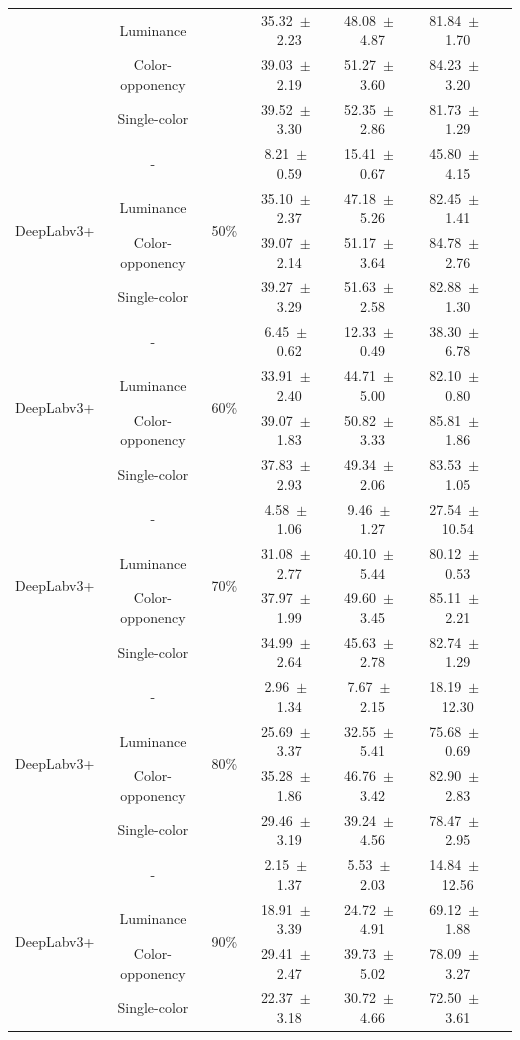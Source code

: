 \begin{table}[h]
\begin{tabular}{@{}lccc ccc@{}}
& Luminance & & 35.32~$\pm$~2.23 & 48.08~$\pm$~4.87 & 81.84~$\pm$~1.70 \\
& Color-opponency & & 39.03~$\pm$~2.19 & 51.27~$\pm$~3.60 & 84.23~$\pm$~3.20 \\
& Single-color & & 39.52~$\pm$~3.30 & 52.35~$\pm$~2.86 & 81.73~$\pm$~1.29 \\
\midrule
\multirow{4}{*}{DeepLabv3+} & - & \multirow{4}{*}{50\%} & 8.21~$\pm$~0.59 & 15.41~$\pm$~0.67 & 45.80~$\pm$~4.15 \\
& Luminance & & 35.10~$\pm$~2.37 & 47.18~$\pm$~5.26 & 82.45~$\pm$~1.41 \\
& Color-opponency & & 39.07~$\pm$~2.14 & 51.17~$\pm$~3.64 & 84.78~$\pm$~2.76 \\
& Single-color & & 39.27~$\pm$~3.29 & 51.63~$\pm$~2.58 & 82.88~$\pm$~1.30 \\
\midrule
\multirow{4}{*}{DeepLabv3+} & - & \multirow{4}{*}{60\%} & 6.45~$\pm$~0.62 & 12.33~$\pm$~0.49 & 38.30~$\pm$~6.78 \\
& Luminance & & 33.91~$\pm$~2.40 & 44.71~$\pm$~5.00 & 82.10~$\pm$~0.80 \\
& Color-opponency & & 39.07~$\pm$~1.83 & 50.82~$\pm$~3.33 & 85.81~$\pm$~1.86 \\
& Single-color & & 37.83~$\pm$~2.93 & 49.34~$\pm$~2.06 & 83.53~$\pm$~1.05 \\
\midrule
\multirow{4}{*}{DeepLabv3+} & - & \multirow{4}{*}{70\%} & 4.58~$\pm$~1.06 & 9.46~$\pm$~1.27 & 27.54~$\pm$~10.54 \\
& Luminance & & 31.08~$\pm$~2.77 & 40.10~$\pm$~5.44 & 80.12~$\pm$~0.53 \\
& Color-opponency & & 37.97~$\pm$~1.99 & 49.60~$\pm$~3.45 & 85.11~$\pm$~2.21 \\
& Single-color & & 34.99~$\pm$~2.64 & 45.63~$\pm$~2.78 & 82.74~$\pm$~1.29 \\
\midrule
\multirow{4}{*}{DeepLabv3+} & - & \multirow{4}{*}{80\%} & 2.96~$\pm$~1.34 & 7.67~$\pm$~2.15 & 18.19~$\pm$~12.30 \\
& Luminance & & 25.69~$\pm$~3.37 & 32.55~$\pm$~5.41 & 75.68~$\pm$~0.69 \\
& Color-opponency & & 35.28~$\pm$~1.86 & 46.76~$\pm$~3.42 & 82.90~$\pm$~2.83 \\
& Single-color & & 29.46~$\pm$~3.19 & 39.24~$\pm$~4.56 & 78.47~$\pm$~2.95 \\
\midrule
\multirow{4}{*}{DeepLabv3+} & - & \multirow{4}{*}{90\%} & 2.15~$\pm$~1.37 & 5.53~$\pm$~2.03 & 14.84~$\pm$~12.56 \\
& Luminance & & 18.91~$\pm$~3.39 & 24.72~$\pm$~4.91 & 69.12~$\pm$~1.88 \\
& Color-opponency & & 29.41~$\pm$~2.47 & 39.73~$\pm$~5.02 & 78.09~$\pm$~3.27 \\
& Single-color & & 22.37~$\pm$~3.18 & 30.72~$\pm$~4.66 & 72.50~$\pm$~3.61 \\
\midrule
\bottomrule
\end{tabular}
\label{tab:sparse_results_deeplabv3plus_acdc_rain}
\end{table}